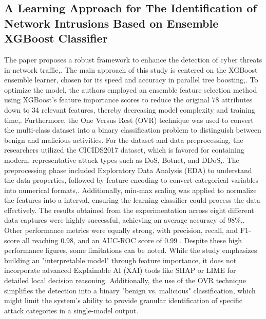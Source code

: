 \documentclass[12pt, a4paper]{article}
\begin{document}
\subsection*{A Learning Approach for The Identification of Network Intrusions Based on Ensemble XGBoost Classifier}
The paper proposes a robust framework to enhance the detection of cyber threats in network traffic,. The main approach of this study is centered on the XGBoost ensemble learner, chosen for its speed and accuracy in parallel tree boosting,. To optimize the model, the authors employed an ensemble feature selection method using XGBoost’s feature importance scores to reduce the original 78 attributes down to 34 relevant features, thereby decreasing model complexity and training time,. Furthermore, the One Versus Rest (OVR) technique was used to convert the multi-class dataset into a binary classification problem to distinguish between benign and malicious activities. For the dataset and data preprocessing, the researchers utilized the CICIDS2017 dataset, which is favored for containing modern, representative attack types such as DoS, Botnet, and DDoS,. The preprocessing phase included Exploratory Data Analysis (EDA) to understand the data properties, followed by feature encoding to convert categorical variables into numerical formats,. Additionally, min-max scaling was applied to normalize the features into a interval, ensuring the learning classifier could process the data effectively. The results obtained from the experimentation across eight different data captures were highly successful, achieving an average accuracy of 98\%,. Other performance metrics were equally strong, with precision, recall, and F1-score all reaching 0.98, and an AUC-ROC score of 0.99 \cite{NID_ensemble_XGBoost}. Despite these high performance figures, some limitations can be noted. While the study emphasizes building an "interpretable model" through feature importance, it does not incorporate advanced Explainable AI (XAI) tools like SHAP or LIME for detailed local decision reasoning. Additionally, the use of the OVR technique simplifies the detection into a binary "benign vs. malicious" classification, which might limit the system's ability to provide granular identification of specific attack categories in a single-model output. 
\end{document}
